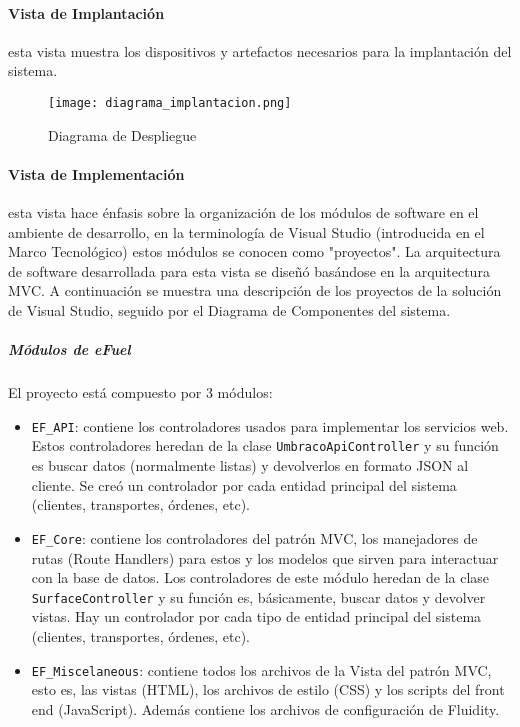 \paragraph{Vista de Implantación} esta vista muestra los dispositivos y artefactos necesarios para la implantación del sistema.

\begin{figure}[H]
    \centering
    \texttt{[image: diagrama\_implantacion.png]}
    \caption{Diagrama de Despliegue}
    \label{fig:diagrama_implantacion}
\end{figure}

\paragraph{Vista de Implementación} esta vista hace énfasis sobre la organización de los módulos de software en el ambiente de desarrollo, en la terminología de Visual Studio (introducida en el Marco Tecnológico) estos módulos se conocen como "proyectos". La arquitectura de software desarrollada para esta vista se diseñó basándose en la arquitectura MVC. A continuación se muestra una descripción de los proyectos de la solución de Visual Studio, seguido por el Diagrama de Componentes del sistema.

\subparagraph*{Módulos de eFuel} El proyecto está compuesto por 3 módulos:
\begin{itemize}
    \item \verb|EF_API|: contiene los controladores usados para implementar los servicios web. Estos controladores heredan de la clase \verb|UmbracoApiController| y su función es buscar datos (normalmente listas) y devolverlos en formato JSON al cliente. Se creó un controlador por cada entidad principal del sistema (clientes, transportes, órdenes, etc).
    \item \verb|EF_Core|: contiene los controladores del patrón MVC, los manejadores de rutas (Route Handlers) para estos y los modelos que sirven para interactuar con la base de datos. Los controladores de este módulo heredan de la clase \verb|SurfaceController| y su función es, básicamente, buscar datos y devolver vistas. Hay un controlador por cada tipo de entidad principal del sistema (clientes, transportes, órdenes, etc).
    \item \verb|EF_Miscelaneous|: contiene todos los archivos de la Vista del patrón MVC, esto es, las vistas (HTML), los archivos de estilo (CSS) y los scripts del front end (JavaScript). Además contiene los archivos de configuración de Fluidity.
\end{itemize}


